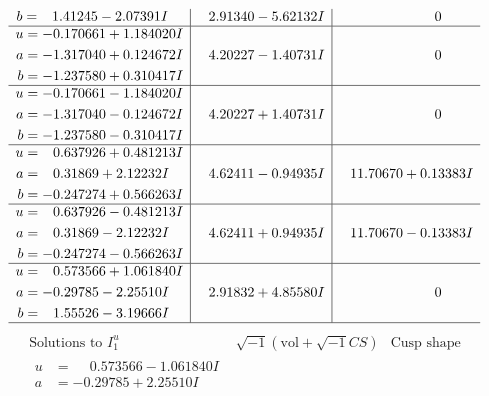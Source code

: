 \documentclass[1p]{elsarticle_modified}
\theoremstyle{definition}
\newcommand{\I}{\sqrt{-1}}
\begin{document}
$$\begin{array}{c|c|c}
\begin{aligned}
b &= \phantom{-}1.41245 - 2.07391 I\end{aligned}
 & \phantom{-}2.91340 - 5.62132 I & \phantom{-0.000000 } 0 \\ \hline\begin{aligned}
u &= -0.170661 + 1.184020 I \\
a &= -1.317040 + 0.124672 I \\
b &= -1.237580 + 0.310417 I\end{aligned}
 & \phantom{-}4.20227 - 1.40731 I & \phantom{-0.000000 } 0 \\ \hline\begin{aligned}
u &= -0.170661 - 1.184020 I \\
a &= -1.317040 - 0.124672 I \\
b &= -1.237580 - 0.310417 I\end{aligned}
 & \phantom{-}4.20227 + 1.40731 I & \phantom{-0.000000 } 0 \\ \hline\begin{aligned}
u &= \phantom{-}0.637926 + 0.481213 I \\
a &= \phantom{-}0.31869 + 2.12232 I \\
b &= -0.247274 + 0.566263 I\end{aligned}
 & \phantom{-}4.62411 - 0.94935 I & \phantom{-}11.70670 + 0.13383 I \\ \hline\begin{aligned}
u &= \phantom{-}0.637926 - 0.481213 I \\
a &= \phantom{-}0.31869 - 2.12232 I \\
b &= -0.247274 - 0.566263 I\end{aligned}
 & \phantom{-}4.62411 + 0.94935 I & \phantom{-}11.70670 - 0.13383 I \\ \hline\begin{aligned}
u &= \phantom{-}0.573566 + 1.061840 I \\
a &= -0.29785 - 2.25510 I \\
b &= \phantom{-}1.55526 - 3.19666 I\end{aligned}
 & \phantom{-}2.91832 + 4.85580 I & \phantom{-0.000000 } 0\\
 \hline 
 \end{array}$$\newpage$$\begin{array}{c|c|c}  
\text{Solutions to }I^u_{1}& \I (\text{vol} + \sqrt{-1}CS) & \text{Cusp shape}\\
 \hline 
\begin{aligned}
u &= \phantom{-}0.573566 - 1.061840 I \\
a &= -0.29785 + 2.25510 I \\

\end{aligned}
\end{array}$$
\end{document}
